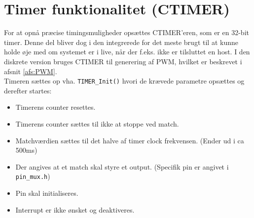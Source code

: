 \section{Timer funktionalitet (CTIMER)}\label{afs:CTIMER}
For at opnå præcise timingsmuligheder opsættes CTIMER'eren, som er en 32-bit timer. Denne del bliver dog i den integrerede for det meste brugt til at kunne holde øje med om systemet er i live, når der f.eks. ikke er tilsluttet en host. I den diskrete version bruges CTIMER til generering af PWM, hvilket er beskrevet i afsnit \ref{afs:PWM}. \\

Timeren sættes op vha. \verb|TIMER_Init()| hvori de krævede parametre opsættes og derefter startes: 

\begin{itemize}[noitemsep]
	\item Timerens counter resettes. 
	\item Timerens counter sættes til ikke at stoppe ved match.
	\item Matchværdien sættes til det halve af timer clock frekvensen. (Ender ud i ca 500ms)
	\item Der angives at et match skal styre et output. (Specifik pin er angivet i \verb|pin_mux.h|)
	\item Pin skal initialiseres. 
	\item Interrupt er ikke ønsket og deaktiveres.
\end{itemize}